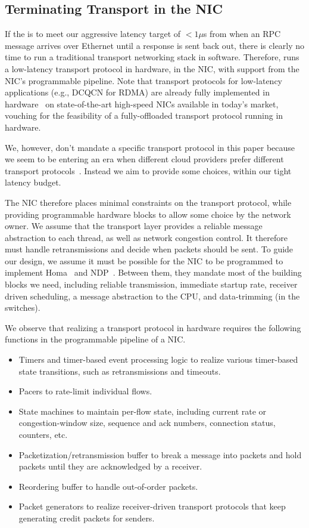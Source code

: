 \subsection{Terminating Transport in the NIC}
\label{ssec:nic-transport}
If the \name{} is to meet our aggressive latency target of $<1\mu$s from when an RPC message arrives over Ethernet until a response is sent back out, there is clearly no time to run a traditional transport networking stack in software. Therefore, \name{} runs a low-latency transport protocol in hardware, in the NIC, with support from the NIC's programmable pipeline. Note that transport protocols for low-latency applications (e.g., DCQCN for RDMA) are already fully implemented in hardware~\cite{cvl,connectx6} on state-of-the-art high-speed NICs available in today's market, vouching for the feasibility of a fully-offloaded transport protocol running in hardware.

We, however, don't mandate a specific transport protocol in this paper because we seem to be entering an era when different cloud providers prefer different transport protocols~\cite{timely,hpcc,dcqcn}. Instead we aim to provide some choices, within our tight latency budget.

The NIC therefore places minimal constraints on the transport protocol, while providing programmable hardware blocks to allow some choice by the network owner. We assume that the transport layer provides a reliable message abstraction to each thread, as well as network congestion control. It therefore must handle retransmissions and decide when packets should be sent. To guide our design, we assume it must be possible for the NIC to be programmed to implement Homa~\cite{homa} and NDP~\cite{ndp}. Between them, they mandate most of the building blocks we need, including reliable transmission, immediate startup rate, receiver driven scheduling, a message abstraction to the CPU, and data-trimming (in the switches).

We observe that realizing a transport protocol in hardware requires the following functions in the programmable pipeline of a NIC.

\begin{itemize}[topsep=0.4\baselineskip, leftmargin=20pt]
    \item Timers and timer-based event processing logic to realize various timer-based state transitions, such as retransmissions and timeouts.
    \item Pacers to rate-limit individual flows.
    \item State machines to maintain per-flow state, including current rate or congestion-window size, sequence and ack numbers, connection status, counters, etc.
    \item Packetization/retransmission buffer to break a message into packets and hold packets until they are acknowledged by a receiver.
    \item Reordering buffer to handle out-of-order packets.
    \item Packet generators to realize receiver-driven transport protocols that keep generating credit packets for senders.
\end{itemize}

